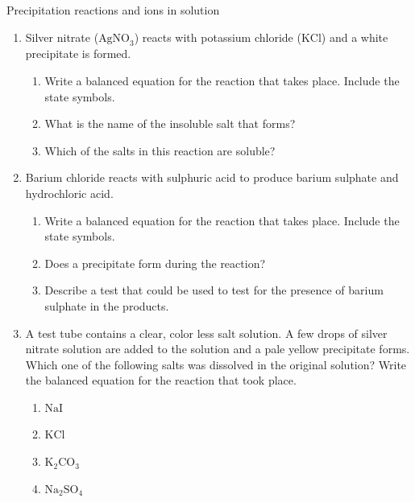 {{\label{m38719*secfhsst!!!underscore!!!id1016}
            \begin{exercises}{Precipitation reactions and ions in solution }
            \nopagebreak
            \label{m38719*id341939}\begin{enumerate}[noitemsep, label=\textbf{\arabic*}. ] 
            \label{m38719*uid74}\item Silver nitrate (${\text{AgNO}}_{3}$) reacts with potassium chloride ($\text{KCl}$) and a white precipitate is formed.
\label{m38719*id341969}\begin{enumerate}[noitemsep, label=\textbf{\alph*}. ] 
            \label{m38719*uid75}\item Write a balanced equation for the reaction that takes place. Include the state symbols. 
\label{m38719*uid76}\item What is the name of the insoluble salt that forms?
\label{m38719*uid77}\item Which of the salts in this reaction are soluble?
\end{enumerate}
\label{m38719*uid78}\item Barium chloride reacts with sulphuric acid to produce barium sulphate and hydrochloric acid.
\label{m38719*id342022}\begin{enumerate}[noitemsep, label=\textbf{\alph*}. ] 
            \label{m38719*uid79}\item Write a balanced equation for the reaction that takes place. Include the state symbols.
\label{m38719*uid80}\item Does a precipitate form during the reaction? 
\label{m38719*uid81}\item Describe a test that could be used to test for the presence of barium sulphate in the products.
\end{enumerate}
\label{m38719*uid82}\item A test tube contains a clear, color less salt solution. A few drops of silver nitrate solution are added to the solution and a pale yellow precipitate forms. Which one of the following salts was dissolved in the original solution? Write the balanced equation for the reaction that took place.
\label{m38719*id342078}\begin{enumerate}[noitemsep, label=\textbf{\alph*}. ] 
            \label{m38719*uid83}\item $\text{NaI}$
\label{m38719*uid84}\item $\text{KCl}$
\label{m38719*uid85}\item ${\text{K}}_{2}{\text{CO}}_{3}$\label{m38719*uid86}\item ${\text{Na}}_{2}{\text{SO}}_{4}$\end{enumerate}

\end{enumerate}
\end{exercises}}}

